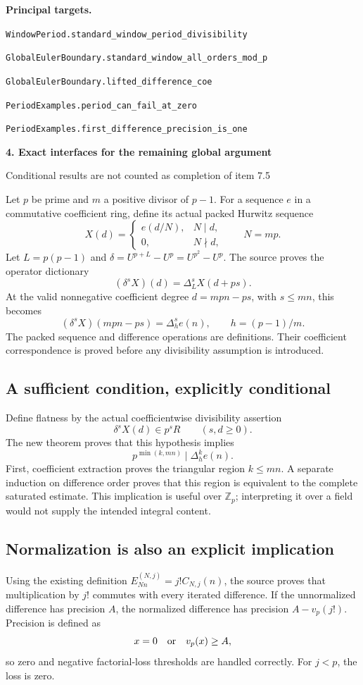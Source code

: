 \documentclass[11pt]{article}
\newcommand{\Z}{\mathbb Z}\newcommand{\N}{\mathbb N}\newcommand{\Q}{\mathbb Q}\newcommand{\F}{\mathbb F}
\newcommand{\target}[1]{{\footnotesize\texttt{#1}}}
\newcommand{\pageheading}[2]{{\Large\bfseries\color{ink}#1}\par{\small #2}\par\medskip}
\begin{document}
\textbf{Principal targets.}\par
\target{WindowPeriod.standard\_window\_period\_divisibility}\par
\target{GlobalEulerBoundary.standard\_window\_all\_orders\_mod\_p}\par
\target{GlobalEulerBoundary.lifted\_difference\_coe}\par
\target{PeriodExamples.period\_can\_fail\_at\_zero}\par
\target{PeriodExamples.first\_difference\_precision\_is\_one}

\newpage
\pageheading{4. Exact interfaces for the remaining global argument}{Conditional results are not counted as completion of item 7.5}
Let $p$ be prime and $m$ a positive divisor of $p-1$. For a sequence $e$ in a commutative coefficient ring, define its actual packed Hurwitz sequence
\[
 X(d)=\begin{cases}e(d/N),&N\mid d,\\0,&N\nmid d,\end{cases}
 \qquad N=mp.
\]
Let $L=p(p-1)$ and $\delta=U^{p+L}-U^p=U^{p^2}-U^p$. The source proves the operator dictionary
\[
 (\delta^sX)(d)=\Delta_L^s X(d+ps).
\]
At the valid nonnegative coefficient degree $d=mpn-ps$, with $s\le mn$, this becomes
\[
 (\delta^sX)(mpn-ps)=\Delta_h^s e(n),\qquad h=(p-1)/m.
\]
The packed sequence and difference operations are definitions. Their coefficient correspondence is proved before any divisibility assumption is introduced.

\subsection*{A sufficient condition, explicitly conditional}
Define flatness by the actual coefficientwise divisibility assertion
\[
 \delta^sX(d)\in p^sR\qquad(s,d\ge0).
\]
The new theorem proves that this hypothesis implies
\[
 \boxed{p^{\min(k,mn)}\mid\Delta_h^k e(n).}
\]
First, coefficient extraction proves the triangular region $k\le mn$. A separate induction on difference order proves that this region is equivalent to the complete saturated estimate. This implication is useful over $\Z_p$; interpreting it over a field would not supply the intended integral content.

\subsection*{Normalization is also an explicit implication}
Using the existing definition $E^{(N,j)}_{Nn}=j!C_{N,j}(n)$, the source proves that multiplication by $j!$ commutes with every iterated difference. If the unnormalized difference has precision $A$, the normalized difference has precision $A-v_p(j!)$. Precision is defined as
\[
 x=0\quad\hbox{or}\quad v_p(x)\ge A,
\]
so zero and negative factorial-loss thresholds are handled correctly. For $j<p$, the loss is zero.
\end{document}
